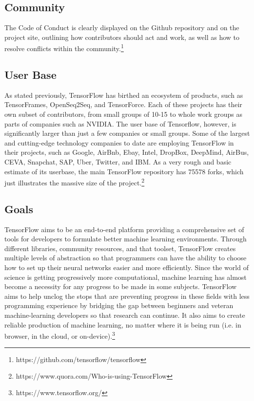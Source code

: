 \documentclass[12pt]{article}
\begin{document}
	\subsection{Community}
	The Code of Conduct is clearly displayed on the Github repository and on the project site, outlining how contributors should act and work, as well as how to resolve conflicts within the community.\footnote{https://github.com/tensorflow/tensorflow}
	
	\subsection{User Base}
	As stated previously, TensorFlow has birthed an ecosystem of products, such as TensorFrames, OpenSeq2Seq, and TensorForce. Each of these projects has their own subset of contributors, from small groups of 10-15 to whole work groups as parts of companies such as NVIDIA. The user base of Tensorflow, however, is significantly larger than just a few companies or small groups. Some of the largest and cutting-edge technology companies to date are employing TensorFlow in their projects, such as Google, AirBnb, Ebay, Intel, DropBox, DeepMind, AirBus, CEVA, Snapchat, SAP, Uber, Twitter, and IBM. As a very rough and basic estimate of its userbase, the main TensorFlow repository has 75578 forks, which just illustrates the massive size of the project.\footnote{https://www.quora.com/Who-is-using-TensorFlow}
	
	\subsection{Goals}
	TensorFlow aims to be an end-to-end platform providing a comprehensive set of tools for developers to formulate better machine learning environments. Through different libraries, community resources, and that toolset, TensorFlow creates multiple levels of abstraction so that programmers can have the ability to choose how to set up their neural networks easier and more efficiently. Since the world of science is getting progressively more computational, machine learning has almost become a necessity for any progress to be made in some subjects. TensorFlow aims to help unclog the stops that are preventing progress in these fields with less programming experience by bridging the gap between beginners and veteran machine-learning developers so that research can continue. It also aims to create reliable production of machine learning, no matter where it is being run (i.e. in browser, in the cloud, or on-device).\footnote{https://www.tensorflow.org/}
	
\end{document}
